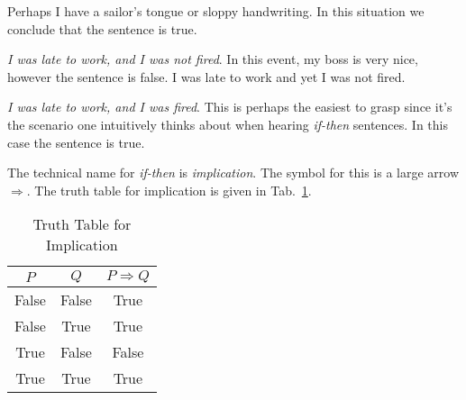 \documentclass{article}
\theoremstyle{plain}
\theoremstyle{normal}
\begin{document}
            Perhaps I have a sailor's tongue or sloppy handwriting. In this
            situation we conclude that the sentence is true.
            \par\hfill\par
            \textit{I was late to work, and I was not fired}. In this event, my
            boss is very nice, however the sentence is false. I was late to work
            and yet I was not fired.
            \par\hfill\par
            \textit{I was late to work, and I was fired}. This is perhaps the
            easiest to grasp since it's the scenario one intuitively thinks
            about when hearing \textit{if-then} sentences. In this case the
            sentence is true.
            \par\hfill\par
            The technical name for \textit{if-then} is \textit{implication}. The
            symbol for this is a large arrow
            $\Rightarrow$. The truth table for implication is given in
            Tab.~\ref{tab:truth_table_implication}.
            \begin{table}
                \centering
                \begin{tabular}{c | c | c}
                    $P$&$Q$&$P\Rightarrow{Q}$\\
                    \hline
                    False&False&True\\
                    \hline
                    False&True&True\\
                    \hline
                    True&False&False\\
                    \hline
                    True&True&True
                \end{tabular}
                \caption{Truth Table for Implication}
                \label{tab:truth_table_implication}
            \end{table}
\end{document}
